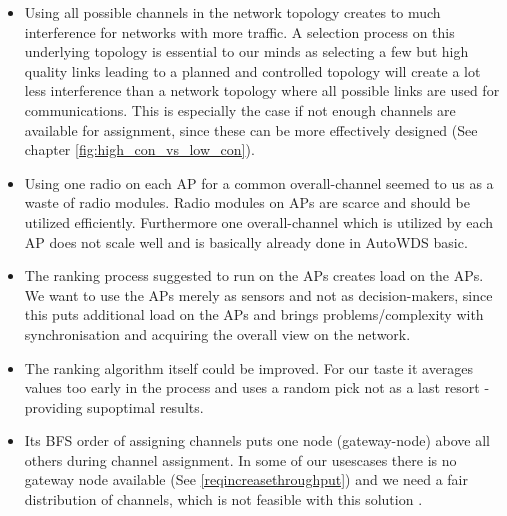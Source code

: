     \begin{itemize}
      \item Using all possible channels in the network topology creates to much interference for networks with more traffic.
	A selection process on this underlying topology is essential to our minds as selecting a few but high quality links
	leading to a planned and controlled topology will create a lot less interference than a network topology where all possible 
	links are used for communications. This is especially the case if not enough channels are available for assignment, since 
	these can be more effectively designed (See chapter \ref{fig:high_con_vs_low_con}).
	\label{topologypreservingdealbreaker}
	
      \item Using one radio on each \ac{AP} for a common overall-channel seemed to us as a waste of radio modules.
	Radio modules on APs are scarce and should be utilized efficiently. 
	Furthermore one overall-channel which is utilized by each \ac{AP} does not scale well and is basically already done in AutoWDS basic.
	
      \item The ranking process suggested to run on the APs creates load on the APs.
	We want to use the APs merely as sensors and not as decision-makers, 
	since this puts additional load on the APs and brings problems/complexity with synchronisation and
	acquiring the overall view on the network.
	
      \item The ranking algorithm itself could be improved. 
	For our taste it averages values too early in the process and uses a random pick not as a last resort - providing supoptimal results.
	
      \item Its \ac{BFS} order of assigning channels puts one node (gateway-node) above all others during channel assignment.
	In some of our usescases there is no gateway node available (See \ref{reqincreasethroughput}) and we need a fair distribution of channels, 
	which is not feasible with this solution \cite{overview_caa}.
    \end{itemize}


